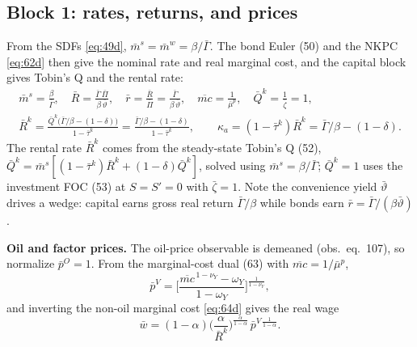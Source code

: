 \subsection{Block 1: rates, returns, and prices}
From the SDFs \eqref{eq:49d}, $\bar m^s=\bar m^w=\beta/\bar\Gamma$. The bond Euler (50) and the NKPC
\eqref{eq:62d} then give the nominal rate and real marginal cost, and the capital block gives Tobin's Q
and the rental rate:
\begin{align}
\bar m^s=\frac{\beta}{\bar\Gamma},\quad
\bar R=\frac{\bar\Gamma\,\bar\Pi}{\beta\,\bar\vartheta},\quad
\bar r=\frac{\bar R}{\bar\Pi}=\frac{\bar\Gamma}{\beta\,\bar\vartheta},\quad
\overline{mc}=\frac{1}{\bar\mu^p},\quad
\bar Q^k=\frac{1}{\bar\zeta}=1, \label{eq:ss-prices1}\\[0.3em]
\bar R^k=\frac{\bar Q^k\big(\bar\Gamma/\beta-(1-\delta)\big)}{1-\bar\tau^k}
=\frac{\bar\Gamma/\beta-(1-\delta)}{1-\bar\tau^k},\qquad
\kappa_a=(1-\bar\tau^k)\bar R^k=\bar\Gamma/\beta-(1-\delta). \label{eq:ss-prices2}
\end{align}
The rental rate $\bar R^k$ comes from the steady-state Tobin's Q (52),
$\bar Q^k=\bar m^s[(1-\bar\tau^k)\bar R^k+(1-\delta)\bar Q^k]$, solved using $\bar m^s=\beta/\bar\Gamma$;
$\bar Q^k=1$ uses the investment FOC (53) at $S=S'=0$ with $\bar\zeta=1$. Note the convenience yield
$\bar\vartheta$ drives a wedge: capital earns gross real return $\bar\Gamma/\beta$ while bonds earn
$\bar r=\bar\Gamma/(\beta\bar\vartheta)$.

\medskip\noindent
\textbf{Oil and factor prices.} The oil-price observable is demeaned (obs.\ eq.\ 107), so normalize
$\bar p^O=1$. From the marginal-cost dual (63) with $\overline{mc}=1/\bar\mu^p$,
\begin{equation}\label{eq:ss-pv}
\bar p^V=\Big[\frac{\overline{mc}^{\,1-\nu_Y}-\omega_Y}{1-\omega_Y}\Big]^{\frac{1}{1-\nu_Y}},
\end{equation}
and inverting the non-oil marginal cost \eqref{eq:64d} gives the real wage
\begin{equation}\label{eq:ss-w}
\bar w=(1-\alpha)\Big(\frac{\alpha}{\bar R^k}\Big)^{\frac{\alpha}{1-\alpha}}\,\bar p^{V\,\frac{1}{1-\alpha}} .
\end{equation}

